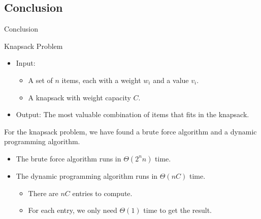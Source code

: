 \documentclass{beamer}
\begin{document}
\subsection{Conclusion}
\begin{frame}{Conclusion}
  \begin{block}{Knapsack Problem}
    \begin{itemize}
      \item Input:
      \begin{itemize}
        \item A set of $n$ items, each with a weight $w_i$ and a value
        $v_i$.
        \item A knapsack with weight capacity $C$.
      \end{itemize}
      \item Output: The most valuable combination of items that fits in the
      knapsack.
    \end{itemize}
    \pause
  \end{block}
  For the knapsack problem, we have found a brute force algorithm and a dynamic
  programming algorithm. \pause
  \begin{itemize}
    \item The brute force algorithm runs in $\Theta(2^nn)$ time. \pause
    \item The dynamic programming algorithm runs in $\Theta(nC)$ time. \pause
    \begin{itemize}
      \item There are $nC$ entries to compute. \pause
      \item For each entry, we only need $\Theta(1)$ time to get the result.
    \end{itemize}
  \end{itemize}
\end{frame}
\end{document}
